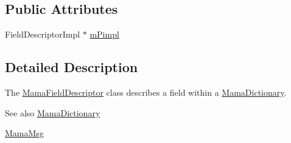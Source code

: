 \subsection*{Public Attributes}
\begin{DoxyCompactItemize}
\item 
FieldDescriptorImpl $\ast$ \hyperlink{classWombat_1_1MamaFieldDescriptor_ac5003e3b2ed4fdf662ba1baa4eef967f}{mPimpl}
\end{DoxyCompactItemize}


\subsection{Detailed Description}
The {\ttfamily \hyperlink{classWombat_1_1MamaFieldDescriptor}{MamaFieldDescriptor}} class describes a field within a {\ttfamily \hyperlink{classWombat_1_1MamaDictionary}{MamaDictionary}}. \begin{DoxySeeAlso}{See also}
\hyperlink{classWombat_1_1MamaDictionary}{MamaDictionary} 

\hyperlink{classWombat_1_1MamaMsg}{MamaMsg} 
\end{DoxySeeAlso}


